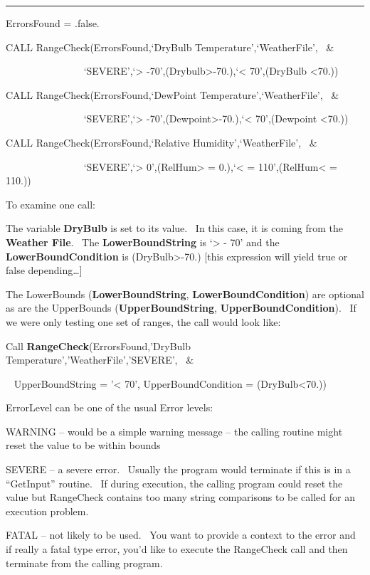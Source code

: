 \begin{center}\rule{0.5\linewidth}{\linethickness}\end{center}

ErrorsFound = .false.

CALL RangeCheck(ErrorsFound,`DryBulb Temperature',`WeatherFile',~ \&

~~~~~~~~~~~~~~~ `SEVERE',`\textgreater{} -70',(Drybulb\textgreater{}-70.),`\textless{} 70',(DryBulb \textless{}70.))

CALL RangeCheck(ErrorsFound,`DewPoint Temperature',`WeatherFile',~ \&

~~~~~~~~~~~~~~~ `SEVERE',`\textgreater{} -70',(Dewpoint\textgreater{}-70.),`\textless{} 70',(Dewpoint \textless{}70.))

CALL RangeCheck(ErrorsFound,`Relative Humidity',`WeatherFile',~ \&

~~~~~~~~~~~~~~~ `SEVERE',`\textgreater{} 0',(RelHum\textgreater{} = 0.),`\textless{} = 110',(RelHum\textless{} = 110.))

To examine one call:

The variable \textbf{DryBulb} is set to its value.~ In this case, it is coming from the \textbf{Weather File}.~ The \textbf{LowerBoundString} is `\textgreater{} - 70' and the \textbf{LowerBoundCondition} is (DryBulb\textgreater{}-70.) {[}this expression will yield true or false depending\ldots{}{]}

The LowerBounds (\textbf{LowerBoundString}, \textbf{LowerBoundCondition}) are optional as are the UpperBounds (\textbf{UpperBoundString}, \textbf{UpperBoundCondition}).~ If we were only testing one set of ranges, the call would look like:

Call \textbf{RangeCheck}(ErrorsFound,'DryBulb Temperature','WeatherFile','SEVERE',~ \&

~ UpperBoundString = '\textless{} 70', UpperBoundCondition = (DryBulb\textless{}70.))

ErrorLevel can be one of the usual Error levels:

WARNING -- would be a simple warning message -- the calling routine might reset the value to be within bounds

SEVERE -- a severe error.~ Usually the program would terminate if this is in a ``GetInput'' routine.~ If during execution, the calling program could reset the value but RangeCheck contains too many string comparisons to be called for an execution problem.

FATAL -- not likely to be used.~ You want to provide a context to the error and if really a fatal type error, you'd like to execute the RangeCheck call and then terminate from the calling program.

